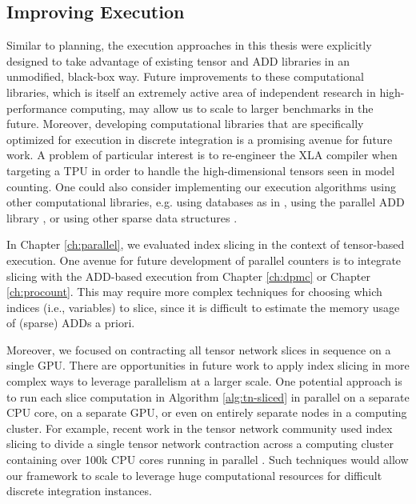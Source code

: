 \subsection{Improving Execution}
Similar to planning, the execution approaches in this thesis were explicitly designed to take advantage of existing tensor and ADD libraries in an unmodified, black-box way.
Future improvements to these computational libraries, which is itself an extremely active area of independent research in high-performance computing, may allow us to scale to larger benchmarks in the future.
Moreover, developing computational libraries that are specifically optimized for execution in discrete integration is a promising avenue for future work.
A problem of particular interest is to re-engineer the XLA compiler when targeting a TPU in order to handle the high-dimensional tensors seen in model counting.
One could also consider implementing our execution algorithms using other computational libraries, e.g. using databases as in \cite{fichte2020exploiting}, using the parallel ADD library \sylvan{} \cite{van2015sylvan}, or using other sparse data structures \cite{sanner2005affine,li2018hicoo}. %

In Chapter \ref{ch:parallel}, we evaluated index slicing in the context of tensor-based execution.
One avenue for future development of parallel counters is to integrate slicing with the ADD-based execution from Chapter \ref{ch:dpmc} or Chapter \ref{ch:procount}.
This may require more complex techniques for choosing which indices (i.e., variables) to slice, since it is difficult to estimate the memory usage of (sparse) ADDs a priori.

Moreover, we focused on contracting all tensor network slices in sequence on a single GPU.
There are opportunities in future work to apply index slicing in more complex ways to leverage parallelism at a larger scale. 
One potential approach is to run each slice computation in Algorithm \ref{alg:tn-sliced} in parallel on a separate CPU core, on a separate GPU, or even on entirely separate nodes in a computing cluster.
For example, recent work in the tensor network community used index slicing to divide a single tensor network contraction across a computing cluster containing over 100k CPU cores running in parallel \cite{CZHNS18}.
Such techniques would allow our framework to scale to leverage huge computational resources for difficult discrete integration instances.


